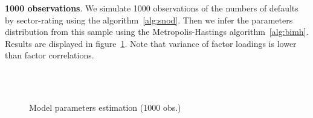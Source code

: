 \documentclass[11pt,fleqn]{book} %
\begin{document}
\begin{example}
	\textbf{1000 observations}. We simulate 1000 observations of the numbers of 
	defaults by sector-rating using the algorithm~\ref{alg:snod}. Then we infer 
	the parameters distribution from this sample using the Metropolis-Hastings 
	algorithm~\ref{alg:bimh}. Results are displayed in figure~\ref{fig:calib1}.
	Note that variance of factor loadings is lower than factor correlations.
	\begin{figure}[!ht]
		\centering
		\hfill
		\\
		\\
		\caption{Model parameters estimation (1000 obs.)}
		\label{fig:calib1}
	\end{figure}


\end{example}
\end{document}

